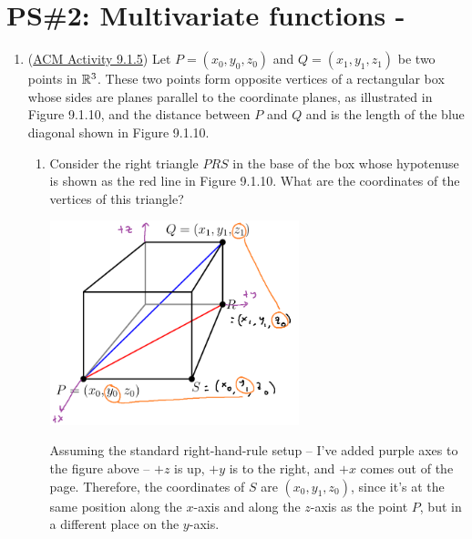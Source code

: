 


%


\allowdisplaybreaks
\section{PS\#2: Multivariate functions -  }

\begin{enumerate}[leftmargin=0pt]
    \item (\href{https://activecalculus.org/multi/S-9-1-Functions.html#A-9-1-4}{ACM Activity 9.1.5}) Let $P = (x_0, y_0, z_0)$ and $Q = (x_1, y_1, z_1)$ be two points in $\mathbb{R}^3$. These two points form opposite vertices of a rectangular box whose sides are planes parallel to the coordinate planes, as illustrated in Figure 9.1.10, and the distance between $P$ and $Q$ and is the length of the blue diagonal shown in Figure 9.1.10.
    \begin{enumerate}
        \item Consider the right triangle $PRS$ in the base of the box whose hypotenuse is shown as the red line in Figure 9.1.10. What are the coordinates of the vertices of this triangle? 
        
        \begin{center}
            \includegraphics[width=0.6\textwidth]{../images/9-1-5-coords.png}
        \end{center}
        
        \begin{red}
            Assuming the standard right-hand-rule setup -- I've added purple axes to the figure above -- $+z$ is up, $+y$ is to the right, and $+x$ comes out of the page. Therefore, the coordinates of $S$ are $(x_0, y_1, z_0)$, since it's at the same position along the $x$-axis and along the $z$-axis as the point $P$, but in a different place on the $y$-axis.


\end{red}
\end{enumerate}
\end{enumerate}
